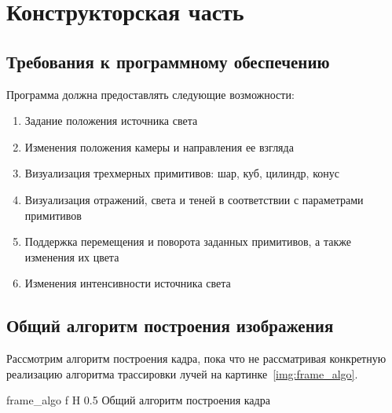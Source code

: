 
\chapter{Конструкторская часть}

\section{Требования к программному обеспечению}
Программа должна предоставлять следующие возможности:
\begin{enumerate}
	\item Задание положения источника света
	\item Изменения положения камеры и направления ее взгляда
	\item Визуализация трехмерных примитивов: шар, куб, цилиндр, конус
	\item Визуализация отражений, света и теней в соответствии с параметрами примитивов
	\item Поддержка перемещения и поворота заданных примитивов, а также изменения их цвета
	\item Изменения интенсивности источника света
\end{enumerate}

\section{Общий алгоритм построения изображения}
Рассмотрим алгоритм построения кадра, пока что не рассматривая конкретную реализацию алгоритма трассировки лучей на картинке~\ref{img:frame_algo}.




{frame_algo} %
{f} %
{H} %
{0.5\textwidth} %
{Общий алгоритм построения кадра} %




